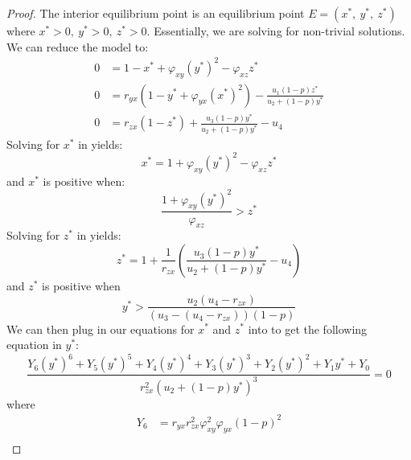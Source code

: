 \begin{proof}
    The interior equilibrium point is an equilibrium point $E=\left(x^*,\ y^*,\ z^*\right)$ where $x^*>0,\ y^*>0,\ z^*>0$. Essentially, we are solving  for non-trivial solutions. We can reduce the model to:
    \begin{subequations}\label{system:interior}
        \begin{align}
            0 &= 1-x^*+\varphi_{xy}\left(y^*\right)^2-\varphi_{xz}z^* \label{eq:interior-x}\\
            0 &= r_{yx}\left(1-y^*+\varphi_{yx}\left(x^*\right)^2\right)-\frac{u_1\left(1-p\right)z^*}{u_2+\left(1-p\right)y^*} \label{eq:interior-y}\\
            0 &= r_{zx}\left(1-z^*\right)+\frac{u_3\left(1-p\right)y^*}{u_2+\left(1-p\right)y^*}-u_4 \label{eq:interior-z}
        \end{align}
    \end{subequations}
    Solving for $x^*$ in  yields:
    \begin{equation*}
        x^*=1+\varphi_{xy}\left(y^*\right)^2-\varphi_{xz}z^*
    \end{equation*}
    and $x^*$ is positive when:
    \begin{equation*}
        \frac{1+\varphi_{xy}\left(y^*\right)^2}{\varphi_{xz}}>z^*
    \end{equation*}
    Solving for $z^*$ in  yields:
    \begin{equation*}
        z^*=1+\frac{1}{r_{zx}}\left(\frac{u_3\left(1-p\right)y^*}{u_2+\left(1-p\right)y^*}-u_4\right)
    \end{equation*}
    and $z^*$ is positive when
    \begin{equation*}
        y^*>\frac{u_2\left(u_4-r_{zx}\right)}{\left(u_3-\left(u_4-r_{zx}\right)\right)\left(1-p\right)}
    \end{equation*}
    We can then plug in our equations for $x^*$ and $z^*$ into  to get the following equation in $y^*$:
    \begin{equation}\label{eq:interior-Y}
        \frac{Y_6\left(y^*\right)^6+Y_5\left(y^*\right)^5+Y_4\left(y^*\right)^4+Y_3\left(y^*\right)^3+Y_2\left(y^*\right)^2+Y_1y^*+Y_0}{r_{zx}^2\left(u_2+\left(1-p\right)y^*\right)^3}=0
    \end{equation}
    where
    \begin{align*}
        Y_6 &= r_{yx}r_{zx}^2\varphi_{xy}^2\varphi_{yx}\left(1-p\right)^2\\

\end{align*}
\end{proof}
